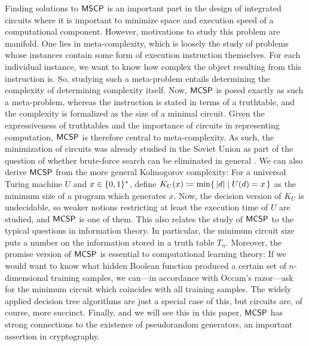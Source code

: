\documentclass[11pt]{article}
\begin{document}
Finding solutions to $\mathsf{MSCP}$ is an important part in the design
of integrated circuits where it is important to minimize space and execution
speed of a computational component.
However, motivations to study this problem are manifold.
%
One lies in meta-complexity, which is loosely the study of problems whose
instances contain some form of execution instruction themselves.
For each individual instance, we want to know how complex the object resulting
from this instruction is.
So, studying such a meta-problem entails determining the complexity of
determining complexity itself.
Now, $\mathsf{MCSP}$ is posed exactly as such a meta-problem, whereas the
instruction is stated in terms of a truthtable, and the complexity is
formalized as the size of a minimal circuit.
Given the expressiveness of truthtables and the importance of circuits in
representing computation, $\mathsf{MCSP}$ is therefore central to
meta-complexity.
%
As such, the minimization of circuits was already studied in the Soviet Union
as part of the question of whether brute-force search can be eliminated
in general \cite{trakhtenbrot84}.
%
We can also derive $\mathsf{MCSP}$ from the more general Kolmogorov complexity:
For a universal Turing machine $U$ and $x \in \{0,1\}^*$, define
$K_U(x) \coloneqq \min \{\, { |d| \mid U(d) = x } \,\}$
as the minimum size of a program which generates $x$.
Now, the decision version of $K_U$ is undecidable, so weaker notions
restricting at least the execution time of $U$ are studied, and
$\mathsf{MCSP}$ is one of them.
%
This also relates the study of $\mathsf{MCSP}$ to the typical questions in
information theory. In particular, the minimum circuit size puts a number on
the information stored in a truth table $T_n$.
%
Moreover, the promise version of $\mathsf{MCSP}$ is essential to computational
learning theory:
If we would want to know what hidden Boolean function produced a certain set of
$n$-dimensional training samples, we can---in accordance with Occam's
razor---ask for the minimum circuit which coincides with all training samples.
The widely applied decision tree algorithms are just a special case of this,
but circuits are, of course, more succinct.
%
Finally, and we will see this in this paper,
$\mathsf{MCSP}$ has strong connections to the existence of
pseudorandom generators, an important assertion in cryptography.
\end{document}

